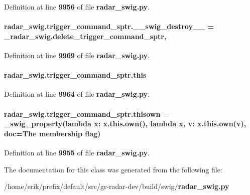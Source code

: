 Definition at line {\bf 9956} of file {\bf radar\+\_\+swig.\+py}.

\paragraph[{\+\_\+\+\_\+swig\+\_\+destroy\+\_\+\+\_\+}]{\setlength{\rightskip}{0pt plus 5cm}radar\+\_\+swig.\+trigger\+\_\+command\+\_\+sptr.\+\_\+\+\_\+swig\+\_\+destroy\+\_\+\+\_\+ = \+\_\+radar\+\_\+swig.\+delete\+\_\+trigger\+\_\+command\+\_\+sptr\hspace{0.3cm}{\ttfamily [static]}, {\ttfamily [private]}}\label{classradar__swig_1_1trigger__command__sptr_aa4434697b7eef2b34d55bb50b24c95d3}


Definition at line {\bf 9969} of file {\bf radar\+\_\+swig.\+py}.

\paragraph[{this}]{\setlength{\rightskip}{0pt plus 5cm}radar\+\_\+swig.\+trigger\+\_\+command\+\_\+sptr.\+this}\label{classradar__swig_1_1trigger__command__sptr_a4a6d72c573c5fdcbac25277446c65b6b}


Definition at line {\bf 9964} of file {\bf radar\+\_\+swig.\+py}.

\paragraph[{thisown}]{\setlength{\rightskip}{0pt plus 5cm}radar\+\_\+swig.\+trigger\+\_\+command\+\_\+sptr.\+thisown = {\bf \+\_\+swig\+\_\+property}(lambda x\+: x.\+this.\+own(), lambda {\bf x}, v\+: x.\+this.\+own(v), doc=\textquotesingle{}The membership flag\textquotesingle{})\hspace{0.3cm}{\ttfamily [static]}}\label{classradar__swig_1_1trigger__command__sptr_a8a33bf2d94d4d20a657f560a847f98da}


Definition at line {\bf 9955} of file {\bf radar\+\_\+swig.\+py}.



The documentation for this class was generated from the following file\+:\begin{DoxyCompactItemize}
\item 
/home/erik/prefix/default/src/gr-\/radar-\/dev/build/swig/{\bf radar\+\_\+swig.\+py}\end{DoxyCompactItemize}
